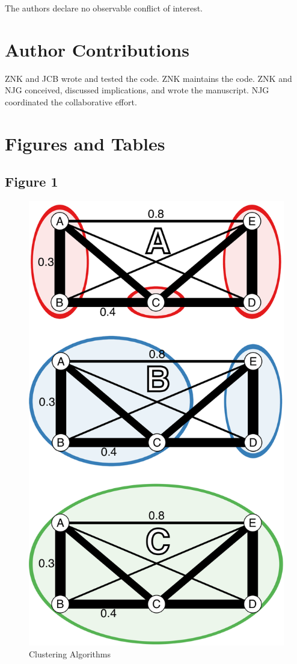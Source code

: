 \documentclass[double,12pt]{beavtex}
\begin{document}
  The authors declare no observable conflict of interest.
  
  \section{Author Contributions}\label{author-contributions}
  
  ZNK and JCB wrote and tested the code. ZNK maintains the code. ZNK and
  NJG conceived, discussed implications, and wrote the manuscript. NJG
  coordinated the collaborative effort.
  
  \section{Figures and Tables}\label{figures-and-tables}
  
  \subsection{Figure 1}\label{figure-1}
  
  \begin{figure}
  
  {\centering \includegraphics[width=0.5\linewidth]{figure/frontiers/Figure-1} 
  
  }
  
  \caption[Clustering Algorithms]{Clustering Algorithms}\label{fig:Figure-1}
  \end{figure}
  
\end{document}
